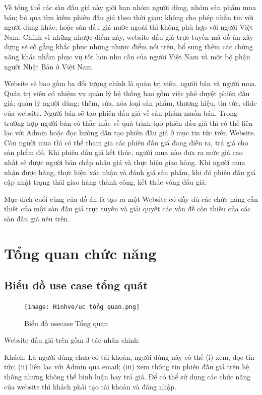 \documentclass[../DoAn.tex]{subfiles}
\begin{document}
Về tổng thể các sàn đấu giá này giới hạn nhóm người dùng, nhóm sản phẩm mua bán; bỏ qua tìm kiếm phiên đấu giá theo thời gian; không cho phép nhắn tin với người dùng khác; hoặc sàn đấu giá nước ngoài thì không phù hợp với người Việt Nam. Chính vì những nhược điểm này, website đấu giá trực tuyến mà đồ án xây dựng sẽ cố gắng khắc phục những nhược điểm nói trên, bổ sung thêm các chứng năng khác nhằm phục vụ tốt hơn nhu cầu của người Việt Nam và một bộ phận người Nhật Bản ở Việt Nam.

Website sẽ bao gồm ba đối tượng chính là quản trị viên, người bán và người mua. Quản trị viên có nhiệm vụ quản lý hệ thống bao gồm việc phê duyệt phiên đấu giá; quản lý người dùng; thêm, sửa, xóa loại sản phẩm, thương hiệu, tin tức, slide của website. Người bán sẽ tạo phiên đấu giá về sản phẩm muốn bán. Trong trường hợp người bán có thắc mắc về quá trình tạo phiên đấu giá thì có thể liên lạc với Admin hoặc đọc hướng dẫn tạo phiên đấu giá ở mục tin tức trên Website. Còn người mua thì có thể tham gia các phiên đấu giá đang diễn ra, trả giá cho sản phẩm đó. Khi phiên đấu giá kết thúc, người mua nào đưa ra mức giá cao nhất sẽ được người bán chấp nhận giá và thực hiện giao hàng. Khi người mua nhận được hàng, thực hiện xác nhận và đánh giá sản phẩm, khi đó phiên đấu giá cập nhật trạng thái giao hàng thành công, kết thúc vòng đấu giá.

Mục đích cuối cùng của đồ án là tạo ra một Website có đầy đủ các chức năng cần thiết của một sàn đấu giá trực tuyến và giải quyết các vấn đề còn thiếu của các sàn đấu giá nêu trên.
\section{Tổng quan chức năng}
\label{section:2.2}
\subsection{Biểu đồ use case tổng quát}
\label{subsection:2.2.1}
\begin{figure}[H]
    \centering
    \texttt{[image: Hinhve/uc tổng quan.png]}
    \caption{Biểu đồ usecase Tổng quan}
    \label{fig:Fig21}
\end{figure}
Website đấu giá trên gồm 3 tác nhân chính:

Khách: Là người dùng chưa có tài khoản, người dùng này có thể (i) xem, đọc tin tức; (ii) liên lạc với Admin qua email; (iii) xem thông tin phiên đấu giá trên hệ thống nhưng không thể bình luận hay trả giá. Để có thể sử dụng các chức năng của website thì khách phải tạo tài khoản và đăng nhập.
\end{document}
